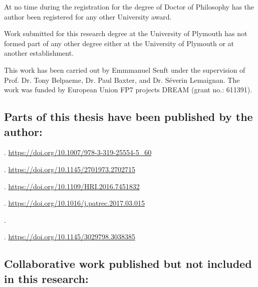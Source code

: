 At no time during the registration for the degree of Doctor of Philosophy has
the author been registered for any other University award. 

Work submitted for this research degree at the University of Plymouth has not formed part of any other degree either at the University of Plymouth or at another establishment.

This work has been carried out by Emmmanuel Senft under the supervision of Prof.
Dr. Tony Belpaeme, Dr. Paul Baxter, and Dr. S\'{e}verin Lemaignan. The work was
funded by European Union FP7 projects DREAM (grant no.: 611391).

\subsection*{Parts of this thesis have been published by the author:}


. \url{https://doi.org/10.1007/978-3-319-25554-5\_60}

. \url{https://doi.org/10.1145/2701973.2702715}

. \url{https://doi.org/10.1109/HRI.2016.7451832}


. \url{https://doi.org/10.1016/j.patrec.2017.03.015}

.

. \url{https://doi.org/10.1145/3029798.3038385}



\subsection*{Collaborative work published but not included in this research:}








